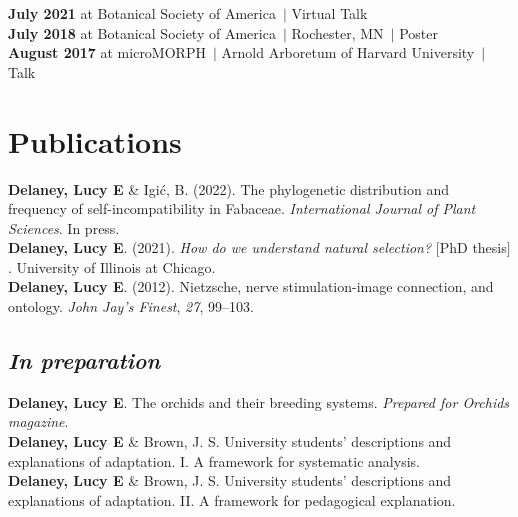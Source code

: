 \documentclass[]{article}
\newlength{\cslhangindent}
\newenvironment{cslreferences}
{\setlength{\parindent}{0pt}
\everypar{\setlength{\hangindent}{\cslhangindent}}\ignorespaces}
{\par}
\begin{document}
\textbf{July 2021} at Botanical Society of America\ $\vert$ Virtual Talk \hspace{0.3mm} \href{https://uofi.box.com/v/2021botany-talk}{\faVideo} \href{https://ledelaney.org/talks/2021botany}{\faImages} \href{https://github.com/ledelaney/07-21-Botany}{\faGithub}\\
\textbf{July 2018} at Botanical Society of America\ $\vert$ Rochester, MN\ $\vert$ Poster \hspace{0.4mm} \href{https://ledelaney.org/static/posters/poster.png}{\faFileImage}\\
\textbf{August 2017} at microMORPH\ $\vert$ Arnold Arboretum of Harvard University\ $\vert$ Talk \hspace{0.4mm} \href{https://www.dropbox.com/s/o7hcg5riw97wf9i/08-2017-microMORPH.pdf?dl=1}{\faImages}

\vspace{4mm}

\section{\fontsize{16}{48}\selectfont Publications}

\begin{cslreferences}

\textbf{Delaney, Lucy E} \& Igić, B. (2022). The phylogenetic distribution and frequency of self-incompatibility in Fabaceae. \textit{International Journal of Plant Sciences}. In press.\\

\textbf{Delaney, Lucy E}. (2021). \emph{How do we understand natural selection?} $[$PhD thesis$]$. University of Illinois at Chicago. \href{https://ledelaney.org/static/docs/Delaney_Lucy_E_Thesis.pdf}{\faFile}\\

\textbf{Delaney, Lucy E}. (2012). Nietzsche, nerve stimulation-image connection, and ontology. \emph{John Jay's Finest}, \emph{27}, 99--103. \href{https://ledelaney.org/static/docs/Delaney-JJAYFinest.pdf}{\faFile}
\end{cslreferences}

\vspace{-4mm}
\subsection{\fontsize{12}{36}\selectfont \textit{In preparation}}
\vspace{-2mm}
\begin{cslreferences}

\textbf{Delaney, Lucy E}. The orchids and their breeding systems. \textit{Prepared for Orchids magazine}.\\

\textbf{Delaney, Lucy E} \& Brown, J. S. University students' descriptions and explanations of adaptation. I. A framework for systematic analysis.\\

\textbf{Delaney, Lucy E} \& Brown, J. S. University students' descriptions and explanations of adaptation. II. A framework for pedagogical explanation.
\end{cslreferences}
\vspace{8mm}
\end{document}
